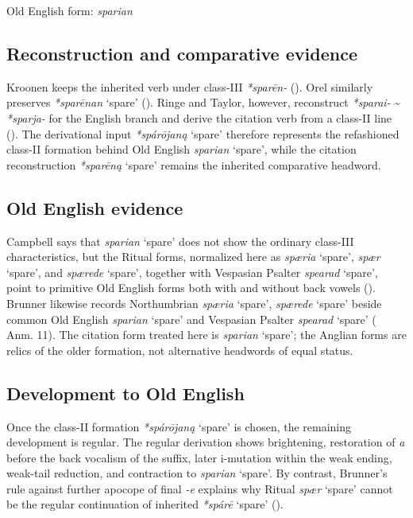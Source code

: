 \documentclass[
  british,
  a4paper,
  openany]{book}
\providecommand{\Recon}[1]{\emph{*#1}}
{\catcode`→=\active \global\def→{\ensuremath{\rightarrow}}}
\providecommand{\Recon}[1]{\emph{*#1}}
{\catcode`→=\active \global\def→{\ensuremath{\rightarrow}}}
\begin{document}
Old English form: \emph{sparian}

\subsection{Reconstruction and comparative
evidence}\label{reconstruction-and-comparative-evidence-96}

Kroonen keeps the inherited verb under class-III {\emph{*sparēn-}}
(). Orel similarly
preserves {\Recon{sparēnan} `spare'} (). Ringe and Taylor, however, reconstruct {\Recon{sparai-}}
\textasciitilde{} {\Recon{sparja-}} for the English branch and derive
the citation verb from a class-II line
(). The
derivational input {\Recon{spárōjaną} `spare'} therefore represents the
refashioned class-II formation behind Old English {\emph{sparian}}
`spare', while the citation reconstruction {\Recon{sparēną} `spare'}
remains the inherited comparative headword.

\subsection{Old English evidence}\label{old-english-evidence-96}

Campbell says that {\emph{sparian}} `spare' does not show the ordinary
class-III characteristics, but the Ritual forms, normalized here as
{\emph{spæria}} `spare', {\emph{spær}} `spare', and {\emph{spærede}}
`spare', together with Vespasian Psalter {\emph{spearad}} `spare', point
to primitive Old English forms both with and without back vowels
(). Brunner
likewise records Northumbrian {\emph{spæria}} `spare', {\emph{spærede}}
`spare' beside common Old English {\emph{sparian}} `spare' and Vespasian
Psalter {\emph{spearad}} `spare'
( Anm. 11).
The citation form treated here is {\emph{sparian}} `spare'; the Anglian
forms are relics of the older formation, not alternative headwords of
equal status.

\subsection{Development to Old
English}\label{development-to-old-english-96}

Once the class-II formation {\Recon{spárōjaną} `spare'} is chosen, the
remaining development is regular. The regular derivation shows
brightening, restoration of \emph{a} before the back vocalism of the
suffix, later i-mutation within the weak ending, weak-tail reduction,
and contraction to {\emph{sparian}} `spare'. By contrast, Brunner's rule
against further apocope of final \emph{-e} explains why Ritual
{\emph{spær}} `spare' cannot be the regular continuation of inherited
{\Recon{spárē} `spare'} ().
\end{document}
